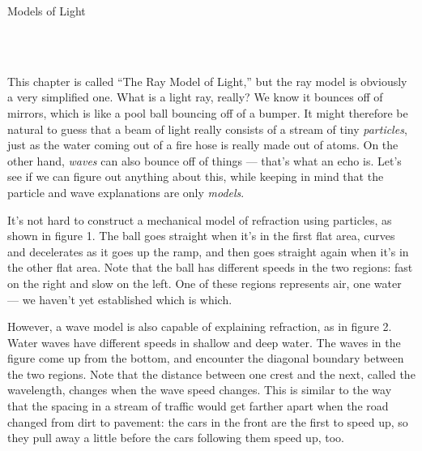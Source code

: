 \begin{lab}{Models of Light}

\apparatus
{}\\
\\


\labintroduction{}

This chapter is called ``The Ray Model of Light,'' but the ray model is obviously a very simplified
one.
What is a light ray, really? We know it bounces off of mirrors, which is like a pool ball bouncing off of
a bumper. It might therefore be natural to guess that a beam of light really consists of a stream of
tiny \emph{particles}, just as the water coming out of a fire hose is really made out of atoms.
On the other hand, \emph{waves} can also bounce off of things --- that's what an echo is. Let's see if we can
figure out anything about this, while keeping in mind that the particle and wave explanations are
only \emph{models}.


It's not hard to construct a mechanical model of refraction using particles, as shown in figure 1. The
ball goes straight when it's in the first flat area, curves and decelerates as it goes up the ramp,
and then goes straight again when it's in the other flat area. Note that the ball has different
speeds in the two regions: fast on the right and slow on the left. One of these regions represents air, one water --- we
haven't yet established which is which.

\label{lab-fig-water}

However, a wave model is also capable of explaining refraction, as in figure 2.
Water waves have different speeds in shallow and deep water. The waves in the figure come up from the bottom,
and encounter the diagonal boundary between the two regions. Note that the distance between one crest and
the next, called the wavelength,
changes when the wave speed changes. This is similar to the way that the spacing in a stream of traffic would get farther apart
when the road changed from dirt to pavement: the cars in the front are the first to speed up, so they pull away a little
before the cars following them speed up, too.


\end{lab}
